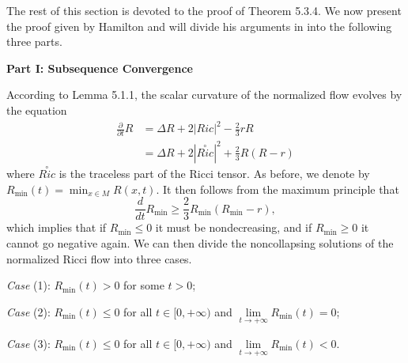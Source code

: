 The rest of this section is devoted to the proof of Theorem 5.3.4.
We now present the proof given by Hamilton \cite{Ha99} and will
divide his arguments in \cite{Ha99} into the following three
parts.

\vskip 0.5cm {\bf Part I: Subsequence Convergence} \vskip 0.2cm

According to Lemma 5.1.1, the scalar curvature of the normalized
flow evolves by the equation
\begin{align}
\frac{\partial }{\partial t}R
&  =\Delta R+2|Ric|^2-\frac{2}{3}rR\\
&  = \Delta R+2|\stackrel{\circ}{Ric}|^2+\frac{2}{3}R(R-r)\nonumber
\end{align}  %
where $\stackrel{\circ}{Ric}$ is the traceless part of the Ricci
tensor. As before, we denote by $R_{\min}(t)=\min_{x\in M}R(x,t)$.
It then follows from the maximum principle that \begin{equation}
\frac{d}{dt}R_{\min}\geq\frac{2}{3}R_{\min}(R_{\min}-r),
\end{equation} which implies that if $R_{\min}\leq0$ it must be
nondecreasing, and if $R_{\min}\geq0$ it cannot go negative again.
We can then divide the noncollapsing solutions of the normalized
Ricci flow into three cases.

\smallskip
{\it Case} (1): $R_{\min}(t)>0$ for some $t>0$;

\smallskip
{\it Case} (2): $R_{\min}(t)\leq0$ for all $t\in[0,+\infty)$ and
$\lim\limits_{t\rightarrow+\infty}R_{\min}(t)=0$;

\smallskip
{\it Case} (3): $R_{\min}(t)\leq0$ for all $t\in[0,+\infty)$ and
$\lim\limits_{t\rightarrow+\infty}R_{\min}(t)<0$.

